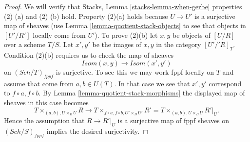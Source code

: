 \documentclass[10pt,a4paper]{amsart}
\theoremstyle{plain}
\theoremstyle{definition}
\theoremstyle{remark}
\numberwithin{equation}{subsection}
\def\Sch{\mathit{Sch}}
\begin{document}
\begin{proof}
We will verify that
Stacks, Lemma \ref{stacks-lemma-when-gerbe}
properties (2) (a) and (2) (b) hold. Property (2)(a) holds because $U \to U'$
is a surjective map of sheaves (use
Lemma \ref{lemma-quotient-stack-objects}
to see that objects in $[U'/R']$ locally come from $U'$).
To prove (2)(b) let $x, y$ be objects of $[U/R]$ over a scheme $T/S$.
Let $x', y'$ be the images of $x, y$ in the category $[U'/'R]_T$.
Condition (2)(b) requires us to check the map of sheaves
$$
\mathit{Isom}(x, y) \longrightarrow \mathit{Isom}(x', y')
$$
on $(\Sch/T)_{fppf}$ is surjective. To see this we may work
fppf locally on $T$ and assume that come from $a, b \in U(T)$.
In that case we see that $x', y'$ correspond to $f \circ a, f \circ b$. By
Lemma \ref{lemma-quotient-stack-morphisms}
the displayed map of sheaves in this case becomes
$$
T \times_{(a, b), U \times_B U} R
\longrightarrow
T \times_{f \circ a, f \circ b, U' \times_B U'} R' =
T \times_{(a, b), U \times_B U} R'|_U.
$$
Hence the assumption that $R \to R'|_U$ is a surjective map of fppf sheaves
on $(\Sch/S)_{fppf}$ implies the desired surjectivity.
\end{proof}
\end{document}
